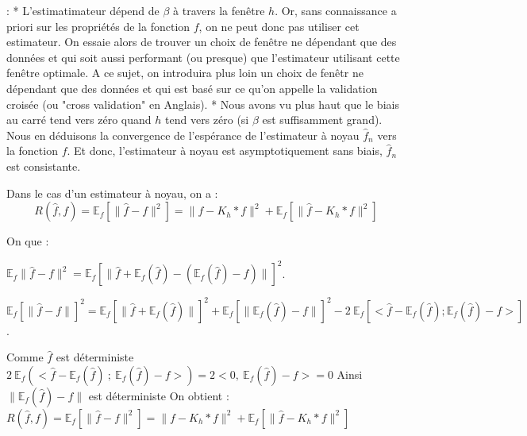 \documentclass[
]{article}
\begin{document}
\begin{remark}:  
  * L'estimatimateur dépend de $\beta$ à travers la fenêtre $h$. Or, sans   connaissance a priori sur les propriétés de la fonction $f$, on ne peut donc pas utiliser cet estimateur. On essaie alors de trouver un choix de fenêtre ne dépendant que des données et qui soit aussi performant (ou presque) que l'estimateur utilisant cette fenêtre optimale. A ce sujet, on introduira plus loin un choix de fenêtr ne dépendant que des données et qui est basé sur ce qu'on appelle la validation croisée (ou "cross validation" en Anglais).  
  * Nous avons vu plus haut que le biais au carré tend vers zéro quand $h$ tend vers zéro (si $\beta$ est suffisamment grand). Nous en déduisons la convergence de l'espérance de l'estimateur à noyau $\hat {f}_n$ vers la fonction $f$. Et donc, l'estimateur à noyau est asymptotiquement sans biais, $\hat {f}_n$ est consistante.\newline
\end{remark}

\begin{proposition}

Dans le cas d'un estimateur à noyau, on a :\newline
$$
R(\hat{f},f)=\mathbb E_f[\parallel\hat{f}-f\parallel^2 ] = \parallel f-K_h*f \parallel^2 + \mathbb E_f[\parallel\hat{f}-K_h*f \parallel^2]
$$
\end{proposition}

\begin{demonstration}
On que :\newline 


$\mathbb E_f\parallel\hat{f}-f \parallel^2 = \mathbb {E}_f[\parallel\hat{f}+\mathbb {E}_f(\hat{f} )-(\mathbb {E}_f(\hat{f} )-f)\parallel ]^2$.\newline

$\mathbb E_f[\parallel\hat{f}-f \parallel]^2 = \mathbb {E}_f[\parallel\hat{f}+\mathbb E_f(\hat{f} )\parallel]^2 +\mathbb {E}_f[\parallel\mathbb {E}_f(\hat{f} )-f\parallel] ^2 - 2~\mathbb {E}_f[<\hat{f}-\mathbb {E}_f(\hat{f});\mathbb {E}_f(\hat{f})-f>]$.\newline

Comme $\hat{f}$ est déterministe\newline 
$2~\mathbb {E}_f(<\hat{f}-\mathbb E_f(\hat{f})~;~\mathbb {E}_f(\hat{f})-f>)=2<0,~\mathbb E_f(\hat{f})-f>=0$\newline
Ainsi $\parallel\mathbb {E}_f(\hat{f} )-f\parallel$ est déterministe\newline
On obtient :\newline
$R(\hat{f},f)=\mathbb {E}_f[\parallel\hat{f}-f\parallel^2 ] = \parallel f-K_h*f \parallel^2 + \mathbb {E}_f[\parallel\hat{f}-K_h*f\parallel^2]$ 
\end{demonstration}
\end{document}
